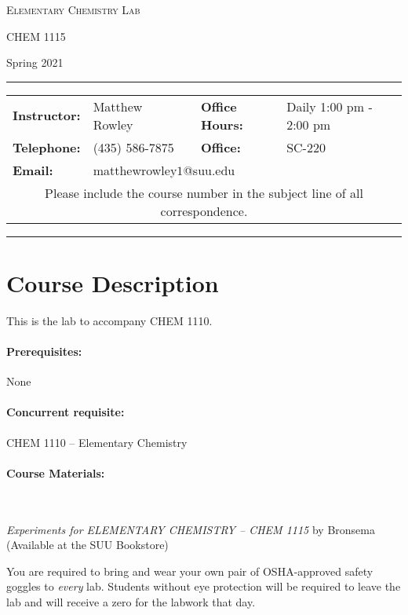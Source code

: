 \documentclass[12pt, letterpaper]{article}
\begin{document}
\begin{center}
{\Large \textsc{Elementary Chemistry Lab}}

CHEM 1115
\end{center}
\begin{center}
	{\large Spring 2021}
\end{center}
\begin{center}
	\rule{0.85\textwidth}{0.4pt}
	\begin{tabular}{llcll}
		\textbf{Instructor:} & Matthew Rowley & & \textbf{Office Hours:} & Daily 1:00 pm - 2:00 pm \\
		\textbf{Telephone:} & (435) 586-7875 & & \textbf{Office:} & SC-220 \\
		\textbf{Email:} & \multicolumn{3}{l}{matthewrowley$1$@suu.edu}\\
		\multicolumn{5}{c}{Please include the course number in the subject line of all correspondence.} 
	\end{tabular}
	\rule{0.85\textwidth}{0.4pt}
\end{center}

\section*{Course Description} 
This is the lab to accompany CHEM 1110.

\paragraph{Prerequisites:}
None

\paragraph{Concurrent requisite:}
CHEM 1110 -- Elementary Chemistry

\paragraph{Course Materials:} ~

\emph{Experiments for ELEMENTARY CHEMISTRY -- CHEM 1115} by Bronsema (Available at the SUU Bookstore)

You are required to bring and wear your own pair of OSHA-approved safety goggles to \emph{every} lab. Students without eye protection will be required to leave the lab and will receive a zero for the labwork that day.
\end{document}
